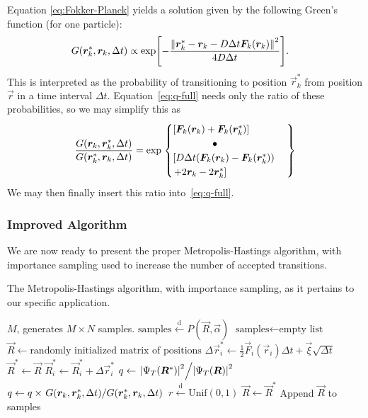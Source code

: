 \documentclass[twocolumn]{article}
\newcommand{\setfrom}{\overset{\mathrm{d}}{\leftarrow}}
\begin{document}
Equation \eqref{eq:Fokker-Planck} yields a solution given by
the following Green's function (for one particle):
\begin{align}
    G(\bm r_k^*, \bm r_k, \Delta t) &\propto 
    \exp[- \frac{\norm{\bm r_k^* - \bm r_k - D\Delta t \bm F_k(\bm r_k)}^2}{4D\Delta t} ].
\end{align}
This is interpreted as the probability of transitioning to position $\vec r_k^*$
from position $\vec r$ in a time interval $\Delta t$. Equation~\eqref{eq:q-full}
needs only the ratio of these probabilities, so we may simplify this as
\begin{align}
    \frac{G(\vec r_k, \vec r_k^*, \Delta t)}{G(\vec r_k^*, \vec r_k, \Delta t)} = 
    \exp\left.\begin{cases}
        \qty[\vec F_k(\vec r_k) + \vec F_k(\vec r_k^*)]\\
        \qqtext{}\qqtext{}\bullet\\
        \left[D\Delta t \qty(\vec F_k(\vec r_k)-\vec F_k(\vec r_k^*)) \right.\\
        \left. + 2\vec r_k - 2\vec r_k^*\right]
    \end{cases}\right\}\label{eq:Greens-ratio}
\end{align}
We may then finally insert this ratio into~\eqref{eq:q-full}.



\subsubsection{Improved Algorithm}
We are now ready to present the proper Metropolis-Hastings algorithm, with
importance sampling used to increase the number of accepted transitions.

\begin{algorithm}[H]
    \caption{The Metropolis-Hastings algorithm, with importance sampling, as it
    pertains to our specific application.}
    \label{alg:metropolis-importance}
    \begin{algorithmic}[1]
        \REQUIRE $M$, generates $M\times N$ samples.
        \ENSURE $\text{samples} \setfrom P(\vec R, \vec\alpha)$
        \STATE $\text{samples} \leftarrow \text{empty list}$
        \STATE $\vec R \leftarrow \text{randomly initialized matrix of positions}$
                \STATE $\Delta\vec r_i^* \leftarrow \frac{1}{2}\vec
                F_i(\vec r_i)\Delta t + \vec \xi\sqrt{\Delta t}$
                \STATE $\vec R^*\leftarrow \vec R $
                \STATE $\vec R^*_i \leftarrow \vec R^{*}_i+ \Delta \vec r_i^*$ 
                \STATE $q \leftarrow \flatfrac{\abs{\Psi_T(\vec R^*)}^2}{\abs{\Psi_T(\vec R)}^2}$
                \STATE $q \leftarrow q \times \flatfrac{G(\vec r_k, \vec r_k^*,
                    \Delta t)}{G(\vec r_k^*, \vec r_k, \Delta t)}$
                \STATE $r \setfrom \text{Unif}(0, 1)$
                    \STATE $\vec R \leftarrow \vec R^*$
                \ENDIF
                \STATE Append $\vec R$ to samples
            \ENDFOR
        \ENDFOR
    \end{algorithmic}
\end{algorithm}
\end{document}
